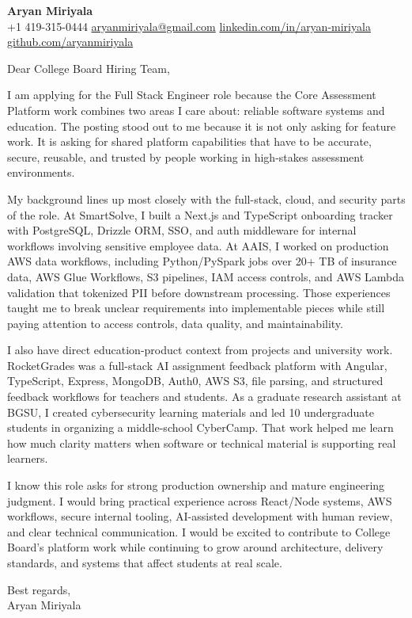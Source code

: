 \documentclass[letterpaper,11pt]{article}
\begin{document}
\begin{center}
    {\Large \textbf{Aryan Miriyala}}\\
    \vspace{2pt}
    +1 419-315-0444 \textbar{} \href{mailto:aryanmiriyala@gmail.com}{aryanmiriyala@gmail.com} \textbar{} \href{https://www.linkedin.com/in/aryan-miriyala-7788a21b6/}{linkedin.com/in/aryan-miriyala} \textbar{} \href{https://github.com/aryanmiriyala}{github.com/aryanmiriyala}
\end{center}

\vspace{10pt}

Dear College Board Hiring Team,

I am applying for the Full Stack Engineer role because the Core Assessment Platform work combines two areas I care about: reliable software systems and education. The posting stood out to me because it is not only asking for feature work. It is asking for shared platform capabilities that have to be accurate, secure, reusable, and trusted by people working in high-stakes assessment environments.

My background lines up most closely with the full-stack, cloud, and security parts of the role. At SmartSolve, I built a Next.js and TypeScript onboarding tracker with PostgreSQL, Drizzle ORM, SSO, and auth middleware for internal workflows involving sensitive employee data. At AAIS, I worked on production AWS data workflows, including Python/PySpark jobs over 20+ TB of insurance data, AWS Glue Workflows, S3 pipelines, IAM access controls, and AWS Lambda validation that tokenized PII before downstream processing. Those experiences taught me to break unclear requirements into implementable pieces while still paying attention to access controls, data quality, and maintainability.

I also have direct education-product context from projects and university work. RocketGrades was a full-stack AI assignment feedback platform with Angular, TypeScript, Express, MongoDB, Auth0, AWS S3, file parsing, and structured feedback workflows for teachers and students. As a graduate research assistant at BGSU, I created cybersecurity learning materials and led 10 undergraduate students in organizing a middle-school CyberCamp. That work helped me learn how much clarity matters when software or technical material is supporting real learners.

I know this role asks for strong production ownership and mature engineering judgment. I would bring practical experience across React/Node systems, AWS workflows, secure internal tooling, AI-assisted development with human review, and clear technical communication. I would be excited to contribute to College Board's platform work while continuing to grow around architecture, delivery standards, and systems that affect students at real scale.

\vspace{8pt}

Best regards,\\
Aryan Miriyala
\end{document}
